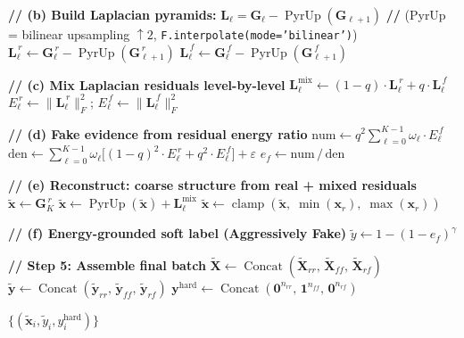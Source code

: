 \documentclass[12pt]{article}
\begin{document}
\begin{algorithm}[p]
\begin{algorithmic}[1]
    \State \textbf{// (b) Build Laplacian pyramids:} $\mathbf{L}_\ell = \mathbf{G}_\ell - \operatorname{PyrUp}(\mathbf{G}_{\ell+1})$
    \State \textbf{//} (PyrUp = bilinear upsampling $\uparrow\!2$, \texttt{F.interpolate(mode='bilinear')})
      \State $\mathbf{L}_\ell^{\,r} \gets \mathbf{G}_\ell^{\,r} - \operatorname{PyrUp}(\mathbf{G}_{\ell+1}^{\,r})$
      \State $\mathbf{L}_\ell^{\,f} \gets \mathbf{G}_\ell^{\,f} - \operatorname{PyrUp}(\mathbf{G}_{\ell+1}^{\,f})$
    \EndFor

    \State \textbf{// (c) Mix Laplacian residuals level-by-level}
      \State $\mathbf{L}_\ell^{\text{mix}} \gets (1 - q) \cdot \mathbf{L}_\ell^{\,r} + q \cdot \mathbf{L}_\ell^{\,f}$
      \State $E_\ell^{\,r} \gets \|\mathbf{L}_\ell^{\,r}\|_F^2$; \quad $E_\ell^{\,f} \gets \|\mathbf{L}_\ell^{\,f}\|_F^2$
    \EndFor

    \State \textbf{// (d) Fake evidence from residual energy ratio}
    \State $\text{num} \gets q^2 \sum_{\ell=0}^{K-1} \omega_\ell \cdot E_\ell^{\,f}$
    \State $\text{den} \gets \sum_{\ell=0}^{K-1} \omega_\ell\big[(1-q)^2 \cdot E_\ell^{\,r} + q^2 \cdot E_\ell^{\,f}\big] + \varepsilon$
    \State $e_f \gets \text{num} \,/\, \text{den}$

    \State \textbf{// (e) Reconstruct: coarse structure from real + mixed residuals}
    \State $\tilde{\mathbf{x}} \gets \mathbf{G}_K^{\,r}$ 
      \State $\tilde{\mathbf{x}} \gets \operatorname{PyrUp}(\tilde{\mathbf{x}}) + \mathbf{L}_\ell^{\text{mix}}$
    \EndFor
    \State $\tilde{\mathbf{x}} \gets \operatorname{clamp}(\tilde{\mathbf{x}},\; \min(\mathbf{x}_r),\; \max(\mathbf{x}_r))$

    \State \textbf{// (f) Energy-grounded soft label (Aggressively Fake)}
    \State $\tilde{y} \gets 1 - (1 - e_f)^{\gamma}$
  \EndFor
\EndIf

\State \textbf{// Step 5: Assemble final batch}
\State $\tilde{\mathbf{X}} \gets \operatorname{Concat}(\tilde{\mathbf{X}}_{rr},\, \tilde{\mathbf{X}}_{ff},\, \tilde{\mathbf{X}}_{rf})$
\State $\tilde{\mathbf{y}} \gets \operatorname{Concat}(\tilde{\mathbf{y}}_{rr},\, \tilde{\mathbf{y}}_{ff},\, \tilde{\mathbf{y}}_{rf})$
\State $\mathbf{y}^{\text{hard}} \gets \operatorname{Concat}(\mathbf{0}^{n_{rr}},\, \mathbf{1}^{n_{ff}},\, \mathbf{0}^{n_{rf}})$

\State \Return $\{(\tilde{\mathbf{x}}_i, \tilde{y}_i, y^{\text{hard}}_i)\}$
\end{algorithmic}
\end{algorithm}
\end{document}
